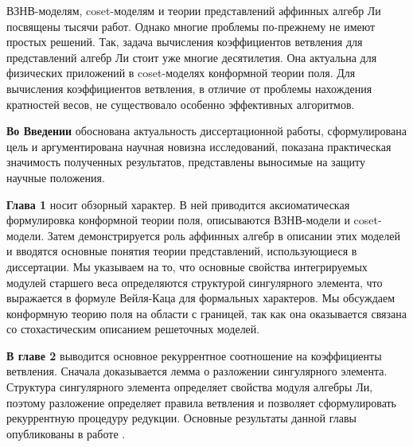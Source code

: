 \documentclass[14pt,autoref,href,facsimile
]{disser}
\begin{document}
ВЗНВ-моделям, coset-моделям и теории представлений аффинных алгебр Ли  посвящены тысячи работ. Однако многие проблемы по-прежнему не имеют простых решений. Так, задача вычисления коэффициентов ветвления для представлений алгебр Ли стоит уже многие десятилетия. Она актуальна для физических приложений в coset-моделях конформной теории поля. Для вычисления коэффициентов ветвления, в отличие от проблемы нахождения кратностей весов, не существовало особенно эффективных алгоритмов. 




\noveltysection
\noveltytext



\resultssection
\resultstext

\approbationsection
\approbationtext

\pubsection
\pubtext

\contribsection
\contribtext

\structsection
\structtext



\vspace{-0.5cm}
\vspace{-0.3cm}
\textbf{Во Введении} обоснована актуальность диссертационной работы,
сформулирована цель и аргументирована научная новизна исследований, показана
практическая значимость полученных результатов, представлены выносимые на
защиту научные положения.

\textbf{Глава 1} носит обзорный характер. В ней приводится аксиоматическая формулировка конформной теории поля, описываются ВЗНВ-модели и coset-модели. Затем демонстрируется роль аффинных алгебр в описании этих моделей и вводятся основные понятия теории представлений, использующиеся в диссертации. Мы указываем на то, что основные свойства интегрируемых модулей старшего веса определяются структурой сингулярного элемента, что выражается в формуле Вейля-Каца для формальных характеров. Мы обсуждаем конформную теорию поля на области с границей, так как она оказывается связана со стохастическим описанием решеточных моделей. 

\textbf{В главе 2} выводится основное рекуррентное соотношение на коэффициенты ветвления. Сначала доказывается лемма о разложении сингулярного элемента. Структура сингулярного элемента определяет свойства модуля алгебры Ли, поэтому разложение определяет правила ветвления и позволяет сформулировать рекуррентную процедуру редукции. Основные результаты данной главы опубликованы в работе . 
\end{document}

